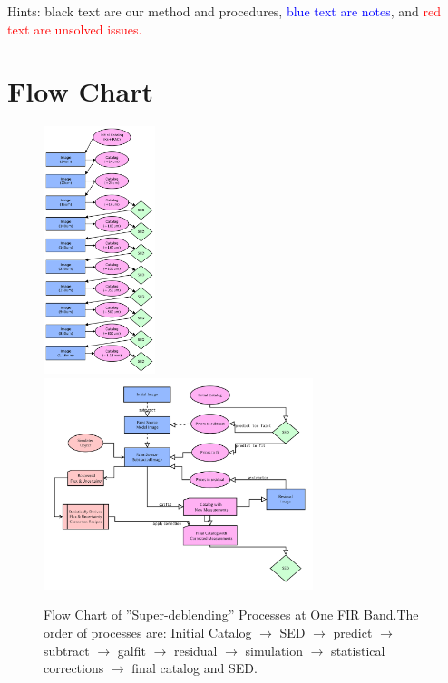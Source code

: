 \documentclass[11pt,a4paper]{article}
\begin{document}
\vspace{5cm}
Hints: black text are our method and procedures, \textcolor{blue}{blue text are notes}, and \textcolor{red}{red text are unsolved issues.}


\clearpage

\section{Flow Chart}
\label{FlowChart}

\begin{figure}[H]
	\caption{{Flow Chart of ''Super-deblending'' Processes at One FIR Band.}\newline The order of processes are: Initial Catalog $\to$ SED $\to$ predict $\to$ subtract $\to$ galfit $\to$ residual $\to$ simulation $\to$ statistical corrections $\to$ final catalog and SED.}
	\centering
	\includegraphics[width=0.29\textwidth]{FlowChart_AllBands}
	\includegraphics[width=0.70\textwidth]{FlowChartDiagram}
\end{figure}
\end{document}
